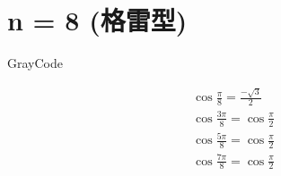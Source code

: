 \chapter{n = 8 (格雷型)}\label{ch:cos8}

GrayCode

$$
\begin{aligned}
    \cos\frac{ π}{8} = \frac{-\sqrt{3}}{2}\\
    \cos\frac{3π}{8} = \cos\frac{π}{2}\\
    \cos\frac{5π}{8} = \cos\frac{π}{2}\\
    \cos\frac{7π}{8} = \cos\frac{π}{2}\\
\end{aligned}
$$
